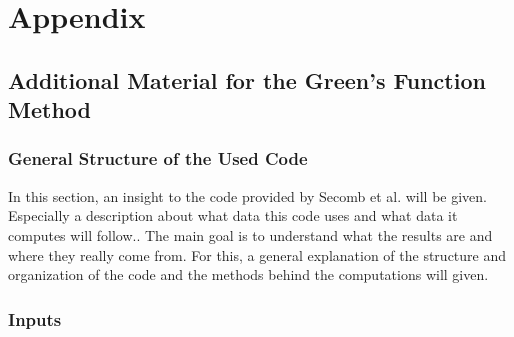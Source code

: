 
\section{Appendix}
\label{s:Appendix}


\subsection{Additional Material for the Green's Function Method}

\subsubsection{General Structure of the Used Code}
\label{GreensCode}

In this section, an insight to the code provided by Secomb et al. \cite{Secomb2004} will be given. Especially a description about what data this code uses and what data it computes will follow.. 
The main goal is to understand what the results are and where they really come from. For this, a general explanation of the structure and organization of the code and the methods behind the computations will given.

\subsubsection*{Inputs}
\label{Inputs}

